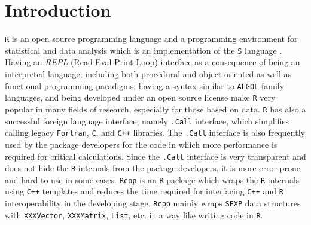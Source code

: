 \documentclass[10pt,a4paper, final, oneside]{article}
\begin{document}
\section{Introduction}
\label{Introduction}
\texttt{R} is an open source programming language and a programming environment for statistical and data analysis \cite{R} which is an implementation of the \texttt{S} language \cite{SLang}. Having an \emph{REPL} (Read-Eval-Print-Loop) interface as a consequence of being an interpreted language; including both procedural and object-oriented as well as functional programming paradigms; having a syntax similar to \texttt{ALGOL}-family languages, and being developed under an open source license make \texttt{R} very popular in many fields of research, especially for those based on data. \texttt{R} has also a successful foreign language interface, namely \texttt{.Call} interface, which simplifies calling legacy \texttt{Fortran}, \texttt{C}, and \texttt{C++} libraries. The \texttt{.Call} interface is also frequently used by the package developers for the code in which more performance is required for critical calculations. Since the \texttt{.Call} interface is very transparent and does not hide the \texttt{R} internals from the package developers, it is more error prone and hard to use in some cases. \texttt{Rcpp} is an \texttt{R} package which wraps the \texttt{R} internals using \texttt{C++} templates and reduces the time required for interfacing \texttt{C++} and \texttt{R} interoperability \cite{eddelbuettel2011rcpp, eddelbuettel2013seamless} in the developing stage. \texttt{Rcpp} mainly wraps \texttt{SEXP} data structures with \texttt{XXXVector}, \texttt{XXXMatrix}, \texttt{List}, etc. in a way like writing code in \texttt{R}. 
\end{document}
